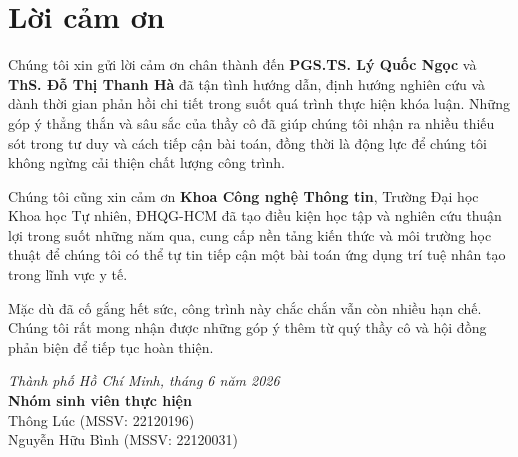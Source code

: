 \chapter*{Lời cảm ơn}
\label{thanks}

Chúng tôi xin gửi lời cảm ơn chân thành đến \textbf{PGS.TS. Lý Quốc Ngọc} và \textbf{ThS. Đỗ Thị Thanh Hà} đã tận tình hướng dẫn, định hướng nghiên cứu và dành thời gian phản hồi chi tiết trong suốt quá trình thực hiện khóa luận. Những góp ý thẳng thắn và sâu sắc của thầy cô đã giúp chúng tôi nhận ra nhiều thiếu sót trong tư duy và cách tiếp cận bài toán, đồng thời là động lực để chúng tôi không ngừng cải thiện chất lượng công trình.

Chúng tôi cũng xin cảm ơn \textbf{Khoa Công nghệ Thông tin}, Trường Đại học Khoa học Tự nhiên, ĐHQG-HCM đã tạo điều kiện học tập và nghiên cứu thuận lợi trong suốt những năm qua, cung cấp nền tảng kiến thức và môi trường học thuật để chúng tôi có thể tự tin tiếp cận một bài toán ứng dụng trí tuệ nhân tạo trong lĩnh vực y tế.

Mặc dù đã cố gắng hết sức, công trình này chắc chắn vẫn còn nhiều hạn chế. Chúng tôi rất mong nhận được những góp ý thêm từ quý thầy cô và hội đồng phản biện để tiếp tục hoàn thiện.

\begin{flushright}
    \textit{Thành phố Hồ Chí Minh, tháng 6 năm 2026}\\[0.5em]
    \textbf{Nhóm sinh viên thực hiện}\\
    Thông Lúc (MSSV: 22120196)\\
    Nguyễn Hữu Bình (MSSV: 22120031)
\end{flushright}
